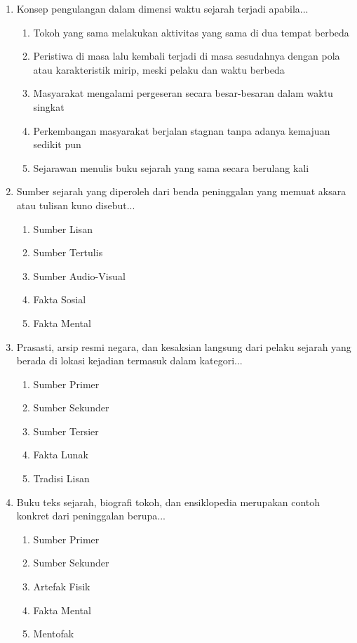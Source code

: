 \documentclass[12pt, a4paper]{article}
\begin{document}
\begin{enumerate}[label=\arabic*.]
    \item Konsep pengulangan dalam dimensi waktu sejarah terjadi apabila...
    \begin{enumerate}[label=\Alph*.]
        \item Tokoh yang sama melakukan aktivitas yang sama di dua tempat berbeda
        \item Peristiwa di masa lalu kembali terjadi di masa sesudahnya dengan pola atau karakteristik mirip, meski pelaku dan waktu berbeda
        \item Masyarakat mengalami pergeseran secara besar-besaran dalam waktu singkat
        \item Perkembangan masyarakat berjalan stagnan tanpa adanya kemajuan sedikit pun
        \item Sejarawan menulis buku sejarah yang sama secara berulang kali
    \end{enumerate}

    \item Sumber sejarah yang diperoleh dari benda peninggalan yang memuat aksara atau tulisan kuno disebut...
    \begin{enumerate}[label=\Alph*.]
        \item Sumber Lisan
        \item Sumber Tertulis
        \item Sumber Audio-Visual
        \item Fakta Sosial
        \item Fakta Mental
    \end{enumerate}

    \item Prasasti, arsip resmi negara, dan kesaksian langsung dari pelaku sejarah yang berada di lokasi kejadian termasuk dalam kategori...
    \begin{enumerate}[label=\Alph*.]
        \item Sumber Primer
        \item Sumber Sekunder
        \item Sumber Tersier
        \item Fakta Lunak
        \item Tradisi Lisan
    \end{enumerate}

    \item Buku teks sejarah, biografi tokoh, dan ensiklopedia merupakan contoh konkret dari peninggalan berupa...
    \begin{enumerate}[label=\Alph*.]
        \item Sumber Primer
        \item Sumber Sekunder
        \item Artefak Fisik
        \item Fakta Mental
        \item Mentofak
    \end{enumerate}


\end{enumerate}
\end{document}
